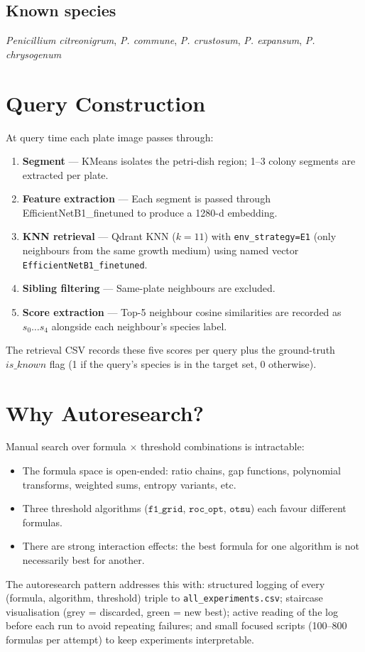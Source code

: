 \documentclass[11pt]{article}
\begin{document}
\subsection{Known species}
\textit{Penicillium citreonigrum}, \textit{P. commune}, \textit{P. crustosum},
\textit{P. expansum}, \textit{P. chrysogenum}

\section{Query Construction}
At query time each plate image passes through:

\begin{enumerate}
  \item \textbf{Segment} — KMeans isolates the petri-dish region; 1--3 colony
        segments are extracted per plate.
  \item \textbf{Feature extraction} — Each segment is passed through
        EfficientNetB1\_finetuned to produce a 1280-d embedding.
  \item \textbf{KNN retrieval} — Qdrant KNN ($k=11$) with \texttt{env\_strategy=E1}
        (only neighbours from the same growth medium) using named vector
        \texttt{EfficientNetB1\_finetuned}.
  \item \textbf{Sibling filtering} — Same-plate neighbours are excluded.
  \item \textbf{Score extraction} — Top-5 neighbour cosine similarities are recorded
        as $s_0 \dots s_4$ alongside each neighbour's species label.
\end{enumerate}

The retrieval CSV records these five scores per query plus the ground-truth
$is\_known$ flag (1 if the query's species is in the target set, 0 otherwise).

\section{Why Autoresearch?}
Manual search over formula $\times$ threshold combinations is intractable:
\begin{itemize}
  \item The formula space is open-ended: ratio chains, gap functions,
        polynomial transforms, weighted sums, entropy variants, etc.
  \item Three threshold algorithms ($\texttt{f1\_grid}$, $\texttt{roc\_opt}$, $\texttt{otsu}$)
        each favour different formulas.
  \item There are strong interaction effects: the best formula for one algorithm
        is not necessarily best for another.
\end{itemize}
The autoresearch pattern addresses this with: structured logging of every
(formula, algorithm, threshold) triple to \texttt{all\_experiments.csv};
staircase visualisation (grey = discarded, green = new best); active reading of
the log before each run to avoid repeating failures; and small focused scripts
(100--800 formulas per attempt) to keep experiments interpretable.
\end{document}
